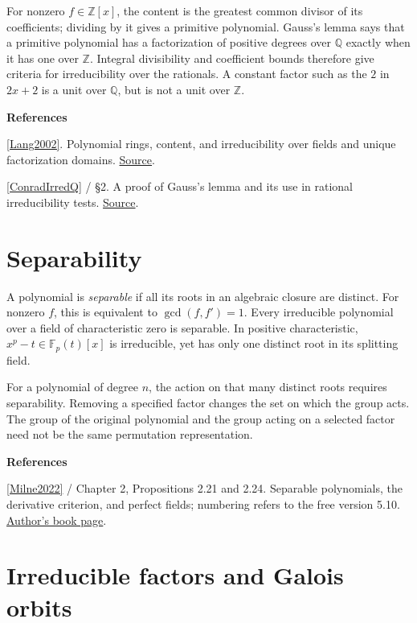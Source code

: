 \documentclass[11pt,a4paper,oneside,openany]{book}
\newenvironment{sources}{\par\smallskip\begingroup\footnotesize\color{atlasgray}\leftskip=10pt\setlength{\parskip}{2pt}}{\par\endgroup\smallskip}
\begin{document}
\color{black} For nonzero \(f\in\mathbb Z[x]\), the content is the greatest common divisor of its coefficients; dividing by it gives a primitive polynomial. Gauss's lemma says that a primitive polynomial has a factorization of positive degrees over \(\mathbb Q\) exactly when it has one over \(\mathbb Z\). Integral divisibility and coefficient bounds therefore give criteria for irreducibility over the rationals. A constant factor such as the \(2\) in \(2x+2\) is a unit over \(\mathbb Q\), but is not a unit over \(\mathbb Z\).\par
\begin{sources}
\textbf{References}\par\smallskip
\noindent\hyperlink{ref:Lang2002}{[Lang2002]}. Polynomial rings, content, and irreducibility over fields and unique factorization domains. \href{https://link.springer.com/book/10.1007/978-1-4613-0041-0}{Source}.\par
\noindent\hyperlink{ref:ConradIrredQ}{[ConradIrredQ]} / §2. A proof of Gauss's lemma and its use in rational irreducibility tests. \href{https://kconrad.math.uconn.edu/blurbs/ringtheory/irredtestsoverQ.pdf}{Source}.\par
\end{sources}\color{black}
\section{Separability}
\color{black} A polynomial is \emph{separable} if all its roots in an algebraic closure are distinct. For nonzero \(f\), this is equivalent to \(\gcd(f,f')=1\). Every irreducible polynomial over a field of characteristic zero is separable. In positive characteristic, \(x^p-t\in\mathbb F_p(t)[x]\) is irreducible, yet has only one distinct root in its splitting field.\par

\color{black} For a polynomial of degree \(n\), the action on that many distinct roots requires separability. Removing a specified factor changes the set on which the group acts. The group of the original polynomial and the group acting on a selected factor need not be the same permutation representation.\par
\begin{sources}
\textbf{References}\par\smallskip
\noindent\hyperlink{ref:Milne2022}{[Milne2022]} / Chapter 2, Propositions 2.21 and 2.24. Separable polynomials, the derivative criterion, and perfect fields; numbering refers to the free version 5.10. \href{https://www.jmilne.org/math/Books/index.html}{Author's book page}.\par
\end{sources}\color{black}
\section{Irreducible factors and Galois orbits}
\end{document}
